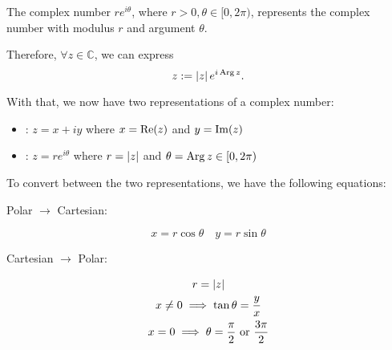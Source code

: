 \documentclass[11pt, oneside]{book}
\begin{document}
\begin{remark}
	The complex number $re^{i \theta}$, where $r > 0, \theta \in [0, 2\pi)$, represents the complex number with modulus $r$ and argument $\theta$.
	\begin{center}
	\end{center}

	Therefore, $\forall z \in \mathbb{C}$, we can express
	\begin{equation}\label{eq:polar representation of a complex number}
		z := \left|z\right| e^{i \operatorname{Arg} z}.
	\end{equation}
\end{remark}

With that, we now have two representations of a complex number:
\begin{itemize}
	\item {}: $z = x + iy$ where $x = \operatorname{Re}(z)$ and $y = \operatorname{Im}(z)$
	\item {}: $z = re^{i \theta}$ where $r = \left|z\right|$ and $\theta = \operatorname{Arg} z \in [0, 2\pi)$
\end{itemize}

To convert between the two representations, we have the following equations:

Polar $\to$ Cartesian:

\begin{equation}\label{eq:polar to cartesian}
	x = r \cos \theta \quad y = r \sin \theta
\end{equation}

Cartesian $\to$ Polar:

\begin{gather}\label{eq:cartesian to polar}
	r = \left|z\right| \nonumber \\
	x \neq 0 \implies \tan \theta = \frac{y}{x} \\
	x = 0 \implies \theta = \frac{\pi}{2} \text{ or } \frac{3\pi}{2} \nonumber
\end{gather}
\end{document}
